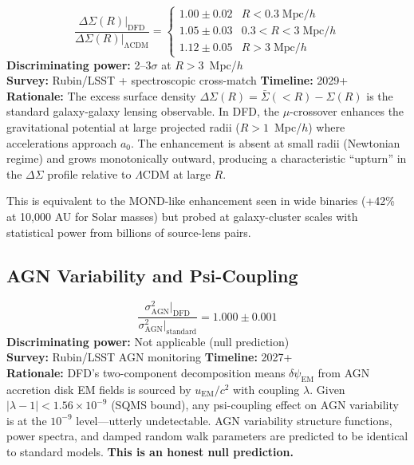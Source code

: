 \documentclass[12pt]{article}
\newcommand{\LCDM}{$\Lambda$CDM}
\begin{document}
\begin{predbox}
\begin{equation}
\boxed{
\frac{\Delta\Sigma(R)\big|_\mathrm{DFD}}{\Delta\Sigma(R)\big|_\mathrm{\Lambda CDM}} = \begin{cases}
1.00 \pm 0.02 & R < 0.3\;\text{Mpc}/h \\
1.05 \pm 0.03 & 0.3 < R < 3\;\text{Mpc}/h \\
1.12 \pm 0.05 & R > 3\;\text{Mpc}/h
\end{cases}
}
\end{equation}
\textbf{Discriminating power:} 2--3$\sigma$ at $R > 3$~Mpc/$h$\\
\textbf{Survey:} Rubin/LSST + spectroscopic cross-match \quad\textbf{Timeline:} 2029+\\
\textbf{Rationale:} The excess surface density $\Delta\Sigma(R) = \bar{\Sigma}(<R) - \Sigma(R)$ is the standard galaxy-galaxy lensing observable. In DFD, the $\mu$-crossover enhances the gravitational potential at large projected radii ($R > 1$~Mpc/$h$) where accelerations approach $a_0$. The enhancement is absent at small radii (Newtonian regime) and grows monotonically outward, producing a characteristic ``upturn'' in the $\Delta\Sigma$ profile relative to \LCDM{} at large $R$.

\medskip\noindent
This is equivalent to the MOND-like enhancement seen in wide binaries (+42\% at 10,000 AU for Solar masses) but probed at galaxy-cluster scales with statistical power from billions of source-lens pairs.
\end{predbox}

\subsection{AGN Variability and Psi-Coupling}

\begin{predbox}
\begin{equation}
\boxed{
\frac{\sigma_\mathrm{AGN}^2\big|_\mathrm{DFD}}{\sigma_\mathrm{AGN}^2\big|_\mathrm{standard}} = 1.000 \pm 0.001
}
\end{equation}
\textbf{Discriminating power:} Not applicable (null prediction)\\
\textbf{Survey:} Rubin/LSST AGN monitoring \quad\textbf{Timeline:} 2027+\\
\textbf{Rationale:} DFD's two-component decomposition means $\delta\psi_\mathrm{EM}$ from AGN accretion disk EM fields is sourced by $u_\mathrm{EM}/c^2$ with coupling $\lambda$. Given $|\lambda-1| < 1.56 \times 10^{-9}$ (SQMS bound), any psi-coupling effect on AGN variability is at the $10^{-9}$ level---utterly undetectable. AGN variability structure functions, power spectra, and damped random walk parameters are predicted to be identical to standard models. \textbf{This is an honest null prediction.}
\end{predbox}
\end{document}
